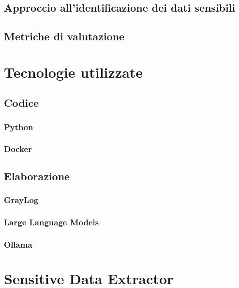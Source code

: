 \documentclass[12pt]{report}
\begin{document}
\section{Approccio all'identificazione dei dati sensibili}
\label{sec:approccio_identificazione}
\section{Metriche di valutazione}
\label{sec:metriche_valutazione}

%
%

\chapter{Tecnologie utilizzate}
\label{chap:tecnologie_utilizzate}

\section{Codice}
\label{sec:codice}
\subsection{Python}
\label{subsec:python}
\subsection{Docker}
\label{subsec:docker}

\section{Elaborazione}
\label{sec:elaborazione}
\subsection{GrayLog}
\label{subsec:graylog}
\subsection{Large Language Models}
\label{subsec:llm}
\subsection{Ollama}
\label{subsec:ollama}




%
%

\chapter{Sensitive Data Extractor}
\label{chap:sensitive_data_extractor}
\end{document}
